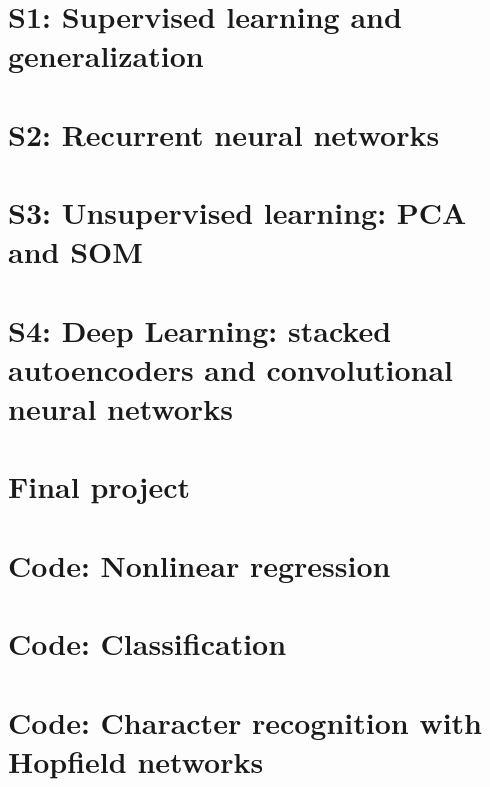 \documentclass[a4paper,12pt]{article}
\begin{document}
\setlength\parindent{0pt}



\tableofcontents
\newpage
\listoffigures
\listoftables

\newpage
\section{S1: Supervised learning and generalization}


\newpage
\section{S2: Recurrent neural networks}


\newpage
\section{S3: Unsupervised learning: PCA and SOM}


\newpage
\section{S4: Deep Learning: stacked autoencoders and convolutional neural networks}


\newpage
\section{Final project}



\newpage
\appendix
\section{Code: Nonlinear regression}

\section{Code: Classification}

\section{Code: Character recognition with Hopfield networks}



\end{document}

